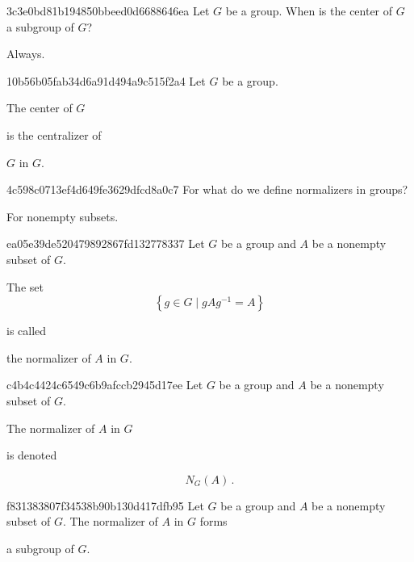 \begin{note}{3c3e0bd81b194850bbeed0d6688646ea}
    Let \({ G }\) be a group.
    When is the center of \({ G }\) a subgroup of \({ G }\)?

    \begin{cloze}{1}
        Always.
    \end{cloze}
\end{note}

\begin{note}{10b56b05fab34d6a91d494a9c515f2a4}
    Let \({ G }\) be a group.
    \begin{icloze}{2}The center of \({ G }\)\end{icloze} is the centralizer of \begin{icloze}{1}\({ G }\) in \({ G }\).\end{icloze}
\end{note}

\begin{note}{4c598c0713ef4d649fe3629dfcd8a0c7}
    For what do we define normalizers in groups?

    \begin{cloze}{1}
        For nonempty subsets.
    \end{cloze}
\end{note}

\begin{note}{ea05e39de520479892867fd132778337}
    Let \({ G }\) be a group and \({ A }\) be a nonempty subset of \({ G }\).
    \begin{icloze}{2}
        The set
        \[
            \left\{ g \in G \mid gAg^{-1} = A \right\}
        \]
    \end{icloze}
    is called \begin{icloze}{1}the normalizer of \({ A }\) in \({ G }\).\end{icloze}
\end{note}

\begin{note}{c4b4c4424c6549c6b9afccb2945d17ee}
    Let \({ G }\) be a group and \({ A }\) be a nonempty subset of \({ G }\).
    \begin{icloze}{2}The normalizer of \({ A }\) in \({ G }\)\end{icloze} is denoted
    \begin{icloze}{1}
        \[
            N_G(A)\,.
        \]
    \end{icloze}
\end{note}

\begin{note}{f831383807f34538b90b130d417dfb95}
    Let \({ G }\) be a group and \({ A }\) be a nonempty subset of \({ G }\).
    The normalizer of \({ A }\) in \({ G }\) forms \begin{icloze}{1}a subgroup of \({ G }\).\end{icloze}
\end{note}

